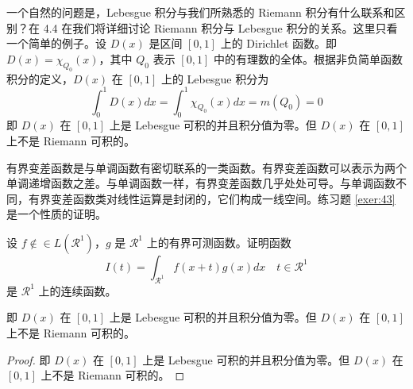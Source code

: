 \documentclass[lang=cn,10pt]{elegantbook}
\begin{document}
一个自然的问题是，Lebesgue 积分与我们所熟悉的 Riemann 积分有什么联系和区别？在 4.4 在我们将详细讨论 Riemann 积分与 Lebesgue 积分的关系。这里只看一个简单的例子。设 $D(x)$ 是区间 $[0,1]$ 上的 Dirichlet 函数。即 $D(x)=\chi_{Q_0}(x)$，其中 $Q_0$ 表示 $[0,1]$ 中的有理数的全体。根据非负简单函数积分的定义，$D(x)$ 在 $[0,1]$ 上的 Lebesgue 积分为
\begin{equation}
   \label{inter2}
   \int_0^1 D(x)dx = \int_0^1 \chi_{Q_0} (x) dx = m(Q_0) = 0
\end{equation}
即 $D(x)$ 在 $[0,1]$ 上是 Lebesgue 可积的并且积分值为零。但 $D(x)$ 在 $[0,1]$ 上不是 Riemann 可积的。


有界变差函数是与单调函数有密切联系的一类函数。有界变差函数可以表示为两个单调递增函数之差。与单调函数一样，有界变差函数几乎处处可导。与单调函数不同，有界变差函数类对线性运算是封闭的，它们构成一线空间。练习题 \ref{exer:43} 是一个性质的证明。

\begin{exercise}\label{exer:43}
设 $f \notin\in L(\mathcal{R}^1)$，$g$ 是 $\mathcal{R}^1$ 上的有界可测函数。证明函数
\begin{equation}
   \label{ex:1}
   I(t) = \int_{\mathcal{R}^1} f(x+t)g(x)dx \quad t \in \mathcal{R}^1
\end{equation}
是 $\mathcal{R}^1$ 上的连续函数。 
\end{exercise}

\begin{solution}
即 $D(x)$ 在 $[0,1]$ 上是 Lebesgue 可积的并且积分值为零。但 $D(x)$ 在 $[0,1]$ 上不是 Riemann 可积的。
\end{solution}

\begin{proof}
即 $D(x)$ 在 $[0,1]$ 上是 Lebesgue 可积的并且积分值为零。但 $D(x)$ 在 $[0,1]$ 上不是 Riemann 可积的。
\end{proof}

%
\end{document}
